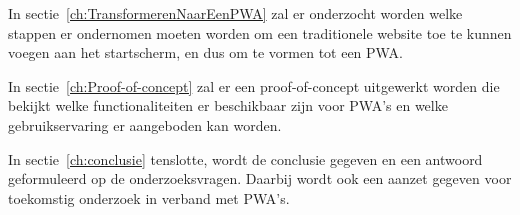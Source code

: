 	In sectie~\ref{ch:TransformerenNaarEenPWA} zal er onderzocht worden welke stappen er ondernomen moeten worden om een traditionele website toe te kunnen voegen aan het startscherm, en dus om te vormen tot een PWA.
	
	In sectie~\ref{ch:Proof-of-concept} zal er een proof-of-concept uitgewerkt worden die bekijkt welke functionaliteiten er beschikbaar zijn voor PWA's en welke gebruikservaring er aangeboden kan worden. 
	
	In sectie~\ref{ch:conclusie} tenslotte, wordt de conclusie gegeven en een antwoord geformuleerd op de onderzoeksvragen. Daarbij wordt ook een aanzet gegeven voor toekomstig onderzoek in verband met PWA's.







